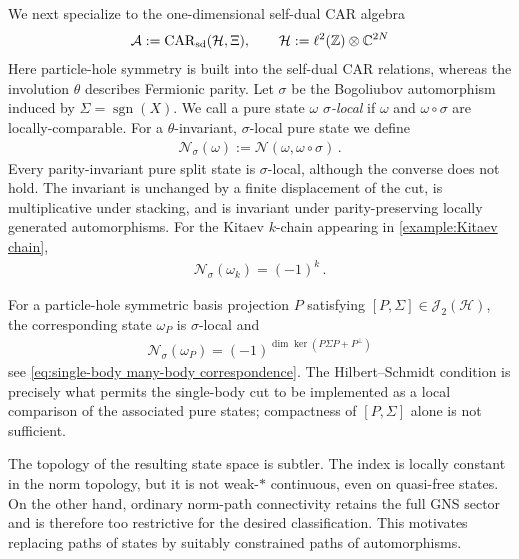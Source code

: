 \documentclass[a4paper,10pt]{article}
\numberwithin{equation}{section}
\theoremstyle{plain}
\theoremstyle{plain}
\theoremstyle{plain}
\theoremstyle{plain}
\theoremstyle{plain}
\theoremstyle{remark}
\theoremstyle{definition}
\newcommand{\ZZ}{\mathbb{Z}}
\newcommand{\CC}{\mathbb{C}}
\newcommand{\calA}{\mathcal{A}}
\newcommand{\calN}{\mathcal{N}}
\newcommand{\calH}{\mathcal{H}}
\newcommand{\calJ}{\mathcal{J}}
\newcommand{\sgn}{\operatorname{sgn}}
\newcommand{\eq}[1]{\begin{align*}#1\end{align*}}
\newcommand{\br}[1]{\left(#1\right)}
\begin{document}

We next specialize to the one-dimensional self-dual CAR algebra
\eq{
    \calA
    :=
    \operatorname{CAR}_{\rm sd}(\calH,\Xi),
    \qquad
    \calH
    :=
    \ell^2(\ZZ)\otimes\CC^{2N}
}
Here particle-hole symmetry is built into the self-dual CAR relations, whereas the involution $\theta$ describes Fermionic parity. Let $\sigma$ be the Bogoliubov automorphism induced by
$\Sigma=\sgn(X)$. We call a pure state $\omega$ \emph{$\sigma$-local} if $\omega$ and $\omega\circ\sigma$ are locally-comparable. For a $\theta$-invariant, $\sigma$-local pure state we define
\eq{
    \calN_\sigma(\omega)
    :=
    \calN(\omega,\omega\circ\sigma)\,.
}
Every parity-invariant pure split state is $\sigma$-local, although the converse does not hold. The invariant is unchanged by a finite displacement of the cut, is multiplicative under stacking, and is invariant under parity-preserving locally generated automorphisms. For the Kitaev $k$-chain appearing in \cref{example:Kitaev chain},
\eq{
    \calN_\sigma(\omega_k)
    =
    \br{-1}^k\,.
}

For a particle-hole symmetric basis projection $P$ satisfying
$[P,\Sigma]\in\calJ_2(\calH)$, the corresponding state $\omega_P$ is $\sigma$-local and
\eq{
    \calN_\sigma(\omega_P)
    =
    \br{-1}^{\dim\ker\br{P\Sigma P+P^\perp}}
}
see \cref{eq:single-body many-body correspondence}. The Hilbert--Schmidt condition is precisely what permits the single-body cut to be implemented as a local comparison of the associated pure states; compactness of $[P,\Sigma]$ alone is not sufficient.

The topology of the resulting state space is subtler. The index is locally constant in the norm topology, but it is not weak-$*$ continuous, even on quasi-free states. On the other hand, ordinary norm-path connectivity retains the full GNS sector and is therefore too restrictive for the desired classification. This motivates replacing paths of states by suitably constrained paths of automorphisms.
\end{document}
